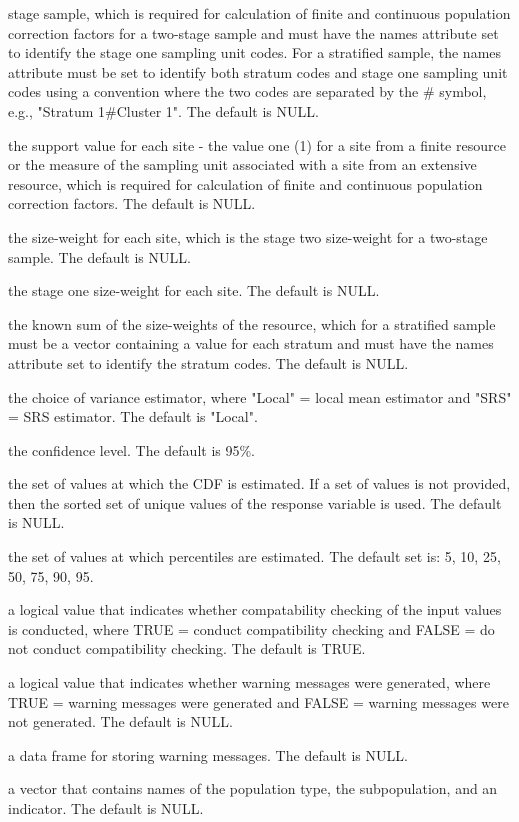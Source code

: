 \begin{Arguments}
\begin{ldescription}
stage sample, which is required for calculation of finite and  
continuous population correction factors for a two-stage sample and 
must have the names attribute set to identify the stage one sampling 
unit codes.  For a stratified sample, the names attribute must be set
to identify both stratum codes and stage one sampling unit codes using
a convention where the two codes are separated by the \# symbol, e.g.,
"Stratum 1\#Cluster 1".  The default is NULL.
\item[\code{support}] the support value for each site - the value one (1) for a 
site from a finite resource or the measure of the sampling unit  
associated with a site from an extensive resource, which is required  
for calculation of finite and continuous population correction  
factors.  The default is NULL.
\item[\code{swgt}] the size-weight for each site, which is the stage two size-weight 
for a two-stage sample.  The default is NULL.
\item[\code{swgt1}] the stage one size-weight for each site.  The default is NULL.
\item[\code{unitsize}] the known sum of the size-weights of the resource, which for a 
stratified sample must be a vector containing a value for each stratum 
and must have the names attribute set to identify the stratum codes.  
The default is NULL.
\item[\code{vartype}] the choice of variance estimator, where "Local" = local mean
estimator and "SRS" = SRS estimator.  The default is "Local".
\item[\code{conf}] the confidence level.  The default is 95\%.
\item[\code{cdfval}] the set of values at which the CDF is estimated.  If a set of
values is not provided, then the sorted set of unique values of the
response variable is used.  The default is NULL.
\item[\code{pctval}] the set of values at which percentiles are estimated.  The
default set is: {5, 10, 25, 50, 75, 90, 95}.
\item[\code{check.ind}] a logical value that indicates whether compatability
checking of the input values is conducted, where TRUE = conduct 
compatibility checking and FALSE = do not conduct compatibility 
checking.  The default is TRUE.
\item[\code{warn.ind}] a logical value that indicates whether warning messages were
generated, where TRUE = warning messages were generated and FALSE = warning
messages were not generated.  The default is NULL.
\item[\code{warn.df}] a data frame for storing warning messages.  The default is
NULL.
\item[\code{warn.vec}] a vector that contains names of the population type, the
subpopulation, and an indicator.  The default is NULL.
\end{ldescription}
\end{Arguments}
